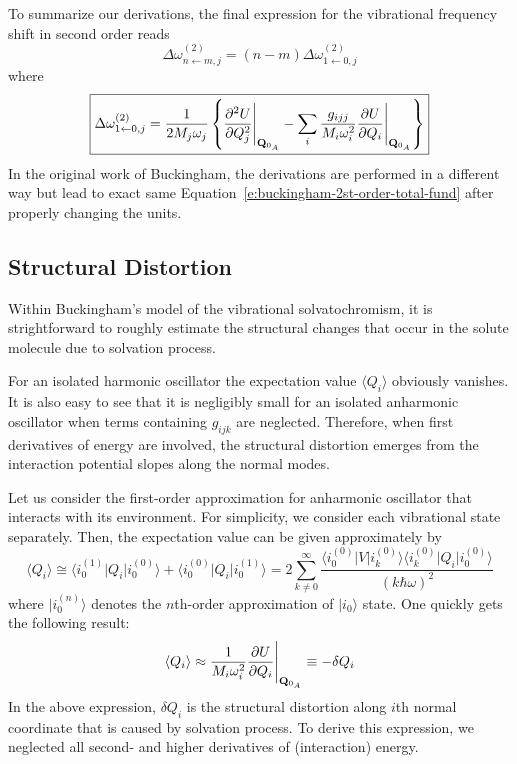 \documentclass[a4paper,titlepage,twoside,fleqn,12pt]{book}
\begin{document}
\begin{refsection}
To summarize our derivations, the final expression for the vibrational frequency shift in 
second order reads
%
\begin{equation}
\label{e:buckingham-2st-order-total}
\boxed{
\Delta \omega_{n\leftarrow m,j}^{(2)} = \left( n-m \right) \Delta \omega_{1\leftarrow 0,j}^{(2)}
}
\end{equation}
%
where
%
\begin{equation}
\label{e:buckingham-2st-order-total-fund}
\boxed{
\Delta \omega_{1\leftarrow 0,j}^{(2)} = 
\frac{1}{2M_j\omega_j} 
\left\{
\frac{\partial^2 U}{\partial Q_j^2} \Bigg|_{{\bf Q}_{0_A}} 
%
- \sum_{i} \frac{g_{ijj}}{M_i\omega_i^2} 
\frac{\partial U}{\partial Q_i} \Bigg|_{{\bf Q}_{0_A}}
\right\}
}
\end{equation}
%
In the original work of Buckingham, the derivations are performed in a different way
but lead to exact same Equation~\eqref{e:buckingham-2st-order-total-fund} 
after properly changing the units.

\subsection{Structural Distortion}

Within Buckingham's model of the vibrational solvatochromism,
it is strightforward to roughly estimate the structural changes
that occur in the solute molecule due to solvation process.

For an isolated harmonic oscillator the expectation value
$\langle Q_i \rangle$ obviously
vanishes. It is also easy to see that it is negligibly small
for an isolated anharmonic oscillator when terms containing $g_{ijk}$
are neglected. Therefore, when first derivatives of energy are involved,
the structural distortion emerges from the interaction potential slopes
along the normal modes.

Let us consider the first\hyp{}order approximation for anharmonic
oscillator that interacts with its environment.
For simplicity, we consider each vibrational state separately.
Then, the expectation value can be given approximately by
%
\begin{equation} 
\langle Q_i \rangle \cong 
\langle i_0^{(1)} \vert Q_i \vert i_0^{(0)} \rangle + \langle i_0^{(0)} \vert Q_i \vert i_0^{(1)} \rangle
= 2\sum_{k\ne 0}^{\infty} \frac{
\langle i_0^{(0)} \vert V \vert i_k^{(0)} \rangle \langle i_k^{(0)} \vert Q_i \vert i_0^{(0)} \rangle
}{\left( k\hbar\omega\right)^2}
\end{equation}
%
where $\vert i_0^{(n)} \rangle$ denotes the $n$th\hyp{}order approximation of $\vert i_0 \rangle$ state.
One quickly gets the following result:
%
\begin{equation}  \label{e:buckingham-struct-dist}
\langle Q_i \rangle \approx \frac{1}{M_i\omega_i^2} \frac{\partial U}{\partial Q_i} \Bigg|_{{\bf Q}_{0_A}} \equiv -\delta Q_i
\end{equation}
%
In the above expression, $\delta Q_i$ is the structural distortion
along $i$th normal coordinate that is caused by solvation process. 
To derive this expression, we neglected all second- and higher derivatives
of (interaction) energy.


\end{refsection}
\end{document}
